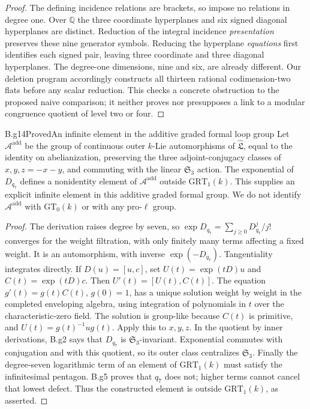 \begin{proof}
The defining incidence relations are brackets, so impose no
relations in degree one.  Over $\mathbb Q$ the three coordinate
hyperplanes and six signed diagonal hyperplanes are distinct.
Reduction of the integral incidence \emph{presentation} preserves
these nine generator symbols.  Reducing the hyperplane \emph{equations}
first identifies each signed pair, leaving three coordinate and three
diagonal hyperplanes.  The degree-one dimensions, nine and six, are
already different.  Our deletion program accordingly constructs all
thirteen rational codimension-two flats before any scalar reduction.
This checks a concrete obstruction to the proposed naive comparison;
it neither proves nor presupposes a link to a modular congruence
quotient of level two or four.
\end{proof}

\begin{claim}{B.g14}{Proved}{An infinite element in the additive graded formal loop group}
Let $\mathcal A^{\mathrm{add}}$ be the group of continuous outer
$k$-Lie automorphisms of $\widehat{\mathfrak L}$, equal to the identity
on abelianization, preserving the three adjoint-conjugacy classes of
$x,y,z=-x-y$, and commuting with the linear $\mathfrak S_3$ action.
The exponential of $D_{q_7}$ defines a nonidentity element of
$\mathcal A^{\mathrm{add}}$ outside $\mathrm{GRT}_1(k)$.
This supplies an explicit infinite element in this additive graded
formal group.  We do not identify $\mathcal A^{\mathrm{add}}$ with
$\mathrm{GT}_0(k)$ or with any pro-$\ell$ group.
\end{claim}

\begin{proof}
The derivation raises degree by seven, so
$\exp D_{q_7}=\sum_{j\geq0}D_{q_7}^j/j!$ converges for the weight
filtration, with only finitely many terms affecting a fixed weight.
It is an automorphism, with inverse $\exp(-D_{q_7})$.
Tangentiality integrates directly.  If $D(u)=[u,c]$, set
$U(t)=\exp(tD)u$ and $C(t)=\exp(tD)c$.  Then
$U'(t)=[U(t),C(t)]$.
The equation $g'(t)=g(t)C(t)$, $g(0)=1$, has a unique solution
weight by weight in the completed enveloping algebra, using integration
of polynomials in $t$ over the characteristic-zero field.
The solution is group-like because $C(t)$ is primitive, and
$U(t)=g(t)^{-1}ug(t)$.  Apply this to $x,y,z$.
In the quotient by inner derivations, B.g2 says that $D_{q_7}$ is
$\mathfrak S_3$-invariant.  Exponential commutes with conjugation and
with this quotient, so its outer class centralizes $\mathfrak S_3$.
Finally the degree-seven logarithmic term of an element of
$\mathrm{GRT}_1(k)$ must satisfy the infinitesimal pentagon.
B.g5 proves that $q_7$ does not; higher terms cannot cancel that
lowest defect.  Thus the constructed element is outside
$\mathrm{GRT}_1(k)$, as asserted.
\end{proof}

